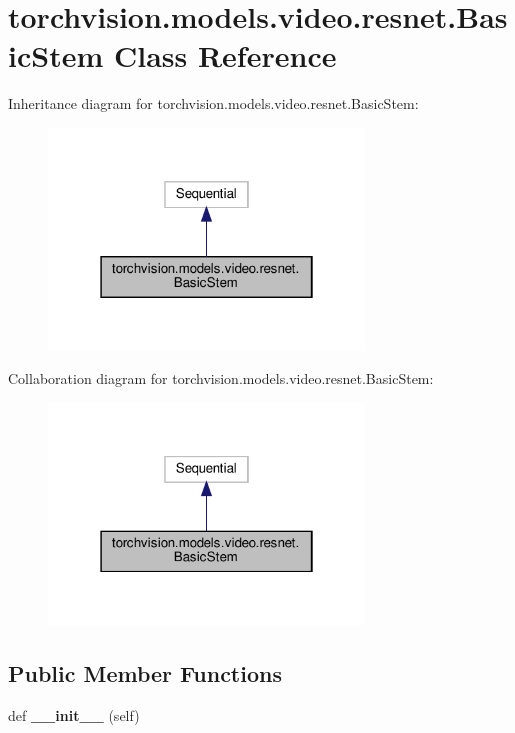 \hypertarget{classtorchvision_1_1models_1_1video_1_1resnet_1_1BasicStem}{}\section{torchvision.\+models.\+video.\+resnet.\+Basic\+Stem Class Reference}
\label{classtorchvision_1_1models_1_1video_1_1resnet_1_1BasicStem}


Inheritance diagram for torchvision.\+models.\+video.\+resnet.\+Basic\+Stem\+:
\nopagebreak
\begin{figure}[H]
\begin{center}
\leavevmode
\includegraphics[width=238pt]{classtorchvision_1_1models_1_1video_1_1resnet_1_1BasicStem__inherit__graph}
\end{center}
\end{figure}


Collaboration diagram for torchvision.\+models.\+video.\+resnet.\+Basic\+Stem\+:
\nopagebreak
\begin{figure}[H]
\begin{center}
\leavevmode
\includegraphics[width=238pt]{classtorchvision_1_1models_1_1video_1_1resnet_1_1BasicStem__coll__graph}
\end{center}
\end{figure}
\subsection*{Public Member Functions}
\begin{DoxyCompactItemize}
\item 
\mbox{\label{classtorchvision_1_1models_1_1video_1_1resnet_1_1BasicStem_aaa432d7f9cbe40cb47a98916881c354f}} 
def {\bfseries \+\_\+\+\_\+init\+\_\+\+\_\+} (self)
\end{DoxyCompactItemize}


